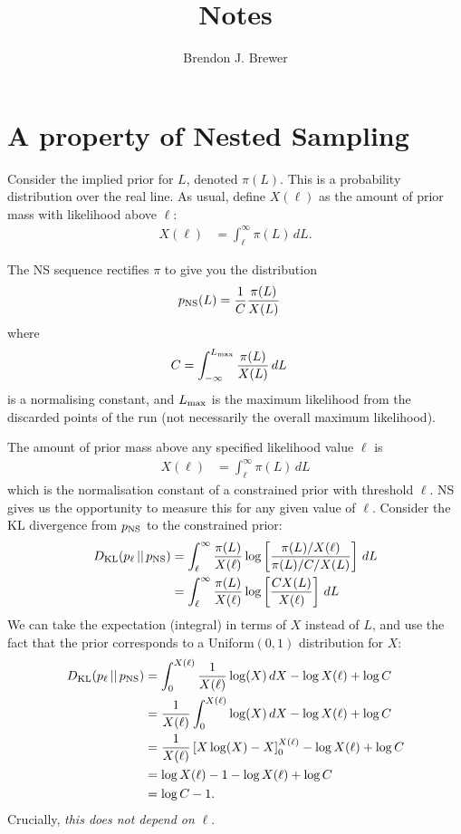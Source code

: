 \documentclass[a4paper, 12pt]{article}
\title{Notes}
\author{Brendon J. Brewer}
\date{}
\begin{document}
\maketitle

\setlength{\parindent}{0pt}
\setlength{\parskip}{8pt}

\section{A property of Nested Sampling}
Consider the implied prior for $L$, denoted $\pi(L)$. This is
a probability distribution over the real line.
As usual, define $X(\ell)$ as the amount of prior mass
with likelihood above $\ell$:
\begin{align}
X(\ell) &= \int_\ell^\infty \pi(L) \, dL.
\end{align}

The NS sequence rectifies $\pi$ to give you the distribution
\begin{align}
p_{\rm NS}(L) &= \frac{1}{C} \frac{\pi(L)}{X(L)}
\end{align}
where
\begin{align}
C &= \int_{-\infty}^{L_{\rm max}} \frac{\pi(L)}{X(L)} \, dL
\end{align}
is a normalising constant,
and $L_{\rm max}$ is the maximum likelihood from the
discarded points of the run
(not necessarily the overall maximum likelihood).


The amount of prior mass above any specified likelihood value
$\ell$ is
\begin{align}
X(\ell) &= \int_{\ell}^{\infty} \pi(L) \, dL 
\end{align}
which is the normalisation constant of a constrained prior with
threshold $\ell$.
NS gives us the opportunity to measure this for any given
value of $\ell$. Consider the KL divergence from $p_{\rm NS}$ to
the constrained prior:
\begin{align}
D_{\rm KL}(p_\ell \,||\, p_{\rm NS})
  &= \int_{\ell}^{\infty} \frac{\pi(L)}{X(\ell)}
           \log\left[\frac{\pi(L)/X(\ell)}{\pi(L)/C/X(L)}\right] \, dL \\
  &= \int_{\ell}^{\infty} \frac{\pi(L)}{X(\ell)}
           \log\left[\frac{CX(L)}{X(\ell)}\right] \, dL
\end{align}
We can take the expectation (integral) in terms of $X$ instead of
$L$, and use the fact that the prior corresponds to a
Uniform$(0,1)$ distribution for $X$:
\begin{align}
D_{\rm KL}(p_\ell \,||\, p_{\rm NS})
    &= \int_0^{X(\ell)} \frac{1}{X(\ell)}
           \log(X) \, dX - \log X(\ell) + \log C \\
    &= \frac{1}{X(\ell)} \int_0^{X(\ell)} \log(X) \, dX
           - \log X(\ell) + \log C \\
    &= \frac{1}{X(\ell)}\left[X\log(X) - X\right]_0^{X(\ell)}
           - \log X(\ell) + \log C \\
    &= \log X(\ell) - 1 - \log X(\ell) + \log C \\
    &= \log C - 1.
\end{align}
Crucially, {\em this does not depend on} $\ell$.
\end{document}
